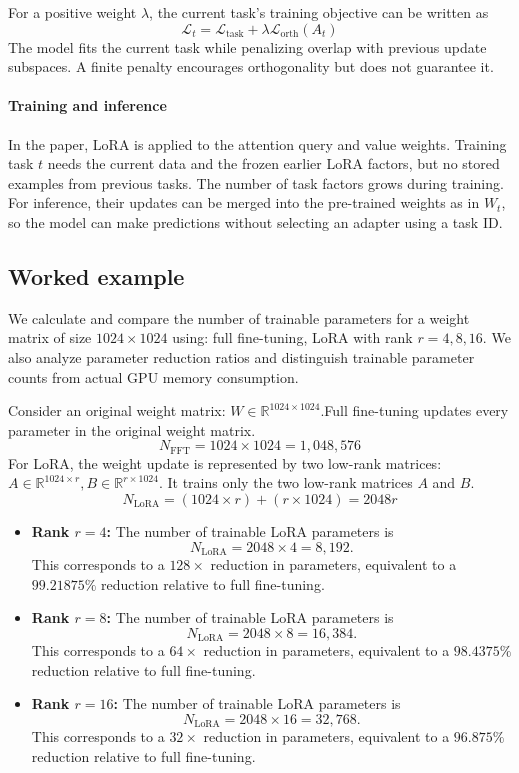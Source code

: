 For a positive weight \(\lambda\), the current task's training objective can be written as
\[
	\mathcal{L}_t =
	\mathcal{L}_{\mathrm{task}}
	+ \lambda \mathcal{L}_{\mathrm{orth}}(A_t)
\]
The model fits the current task while penalizing overlap with previous update subspaces. A finite penalty encourages orthogonality but does not guarantee it.

\paragraph{Training and inference}

In the paper, LoRA is applied to the attention query and value weights. Training task \(t\) needs the current data and the frozen earlier LoRA factors, but no stored examples from previous tasks. The number of task factors grows during training. For inference, their updates can be merged into the pre-trained weights as in \(W_t\), so the model can make predictions without selecting an adapter using a task ID.

\subsection{Worked example}

We calculate and compare the number of trainable parameters for a weight matrix of size \(1024 \times 1024\) using:  full fine-tuning, LoRA with rank $r=4, 8, 16$. We also analyze parameter reduction ratios and distinguish trainable parameter counts from actual GPU memory consumption.

Consider an original weight matrix: \( W \in \mathbb{R}^{1024 \times 1024} \).Full fine-tuning updates every parameter in the original weight matrix.
\[
	N_{\text{FFT}} = 1024 \times 1024 = 1,048,576
\]
For LoRA, the weight update is represented by two low-rank matrices: \(A \in \mathbb{R}^{1024 \times r}, B \in \mathbb{R}^{r \times 1024}\). It trains only the two low-rank matrices \(A\) and \(B\).
\[
	N_{\text{LoRA}} = (1024 \times r) + (r \times 1024) = 2048 r
\]

\begin{itemize}
	\item \textbf{Rank \(r=4\):}
	      The number of trainable LoRA parameters is
	      \[
		      N_{\text{LoRA}} = 2048 \times 4 = 8,192.
	      \]
	      This corresponds to a \(128\times\) reduction in parameters,
	      equivalent to a \(99.21875\%\) reduction relative to full fine-tuning.

	\item \textbf{Rank \(r=8\):}
	      The number of trainable LoRA parameters is
	      \[
		      N_{\text{LoRA}} = 2048 \times 8 = 16,384.
	      \]
	      This corresponds to a \(64\times\) reduction in parameters,
	      equivalent to a \(98.4375\%\) reduction relative to full fine-tuning.

	\item \textbf{Rank \(r=16\):}
	      The number of trainable LoRA parameters is
	      \[
		      N_{\text{LoRA}} = 2048 \times 16 = 32,768.
	      \]
	      This corresponds to a \(32\times\) reduction in parameters,
	      equivalent to a \(96.875\%\) reduction relative to full fine-tuning.
\end{itemize}


